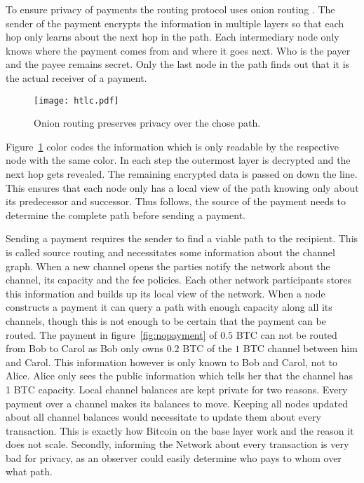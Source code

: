 \documentclass[final]{fhnwreport}       %
\begin{document}
To ensure privacy of payments the routing protocol uses onion routing . The sender of the payment encrypts the information in multiple layers so that each hop only learns about the next hop in the path. Each intermediary node only knows where the payment comes from and where it goes next. Who is the payer and the payee remains secret. Only the last node in the path finds out that it is the actual receiver of a payment.

\begin{figure}[H]
\centering
\texttt{[image: htlc.pdf]}
\caption{Onion routing preserves privacy over the chose path.}
\label{fig:onion}
\end{figure}

Figure~\ref{fig:onion} color codes the information which is only readable by the respective node with the same color. In each step the outermost layer is decrypted and the next hop gets revealed. The remaining encrypted data is passed on down the line. This ensures that each node only has a local view of the path knowing only about its predecessor and successor. Thus follows, the source of the payment needs to determine the complete path before sending a payment.

Sending a payment requires the sender to find a viable path to the recipient. This is called source routing  and necessitates some information about the channel graph. When a new channel opens the parties notify the network about the channel, its capacity and the fee policies. Each other network participants stores this information and builds up its local view of the network. When a node constructs a payment it can query a path with enough capacity along all its channels, though this is not enough to be certain that the payment can be routed. The payment in figure~\ref{fig:nopayment} of $0.5$ BTC can not be routed from Bob to Carol as Bob only owns $0.2$ BTC of the $1$ BTC channel between him and Carol. This information however is only known to Bob and Carol, not to Alice. Alice only sees the public information which tells her that the channel has 1 BTC capacity. Local channel balances are kept private for two reasons. Every payment over a channel makes its balances to move. Keeping all nodes updated about all channel balances would necessitate to update them about every transaction. This is exactly how Bitcoin on the base layer work and the reason it does not scale. Secondly, informing the Network about every transaction is very bad for privacy, as an observer could easily determine who pays to whom over what path.
\end{document}
